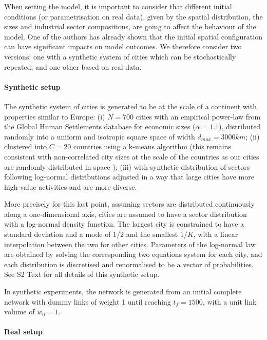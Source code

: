 \documentclass[10pt,letterpaper]{article}
\begin{document}
When setting the model, it is important to consider that different initial conditions (or parametrisation on real data), given by the spatial distribution, the sizes and industrial sector compositions, are going to affect the behaviour of the model. One of the authors \cite{raimbault2019space} has already shown that the initial spatial configuration can have significant impacts on model outcomes. We therefore consider two versions: one with a synthetic system of cities which can be stochastically repeated, and one other based on real data.


\paragraph{Synthetic setup}

The synthetic system of cities is generated to be at the scale of a continent with properties similar to Europe: (i) $N=700$ cities with an empirical power-law from the Global Human Settlements database for economic sizes ($\alpha = 1.1$), distributed randomly into a uniform and isotropic square space of width $d_{max}=3000km$;
(ii) clustered into $C = 20$ countries using a k-means algorithm (this remains consistent with non-correlated city sizes at the scale of the countries as our cities are randomly distributed in space \cite{simini2019testing});
(iii) with synthetic distribution of sectors following log-normal distributions adjusted in a way that large cities have more high-value activities and are more diverse.

More precisely for this last point, assuming sectors are distributed continuously along a one-dimensional axis, cities are assumed to have a sector distribution with a log-normal density function. The largest city is constrained to have a standard deviation and a mode of $1/2$ and the smallest $1/K$, with a linear interpolation between the two for other cities. Parameters of the log-normal law are obtained by solving the corresponding two equations system for each city, and each distribution is discretised and renormalised to be a vector of probabilities. See S2 Text for all details of this synthetic setup.

In synthetic experiments, the network is generated from an initial complete network with dummy links of weight 1 until reaching $t_f=1500$, with a unit link volume of $w_0 = 1$.

     
\paragraph{Real setup}
\end{document}
